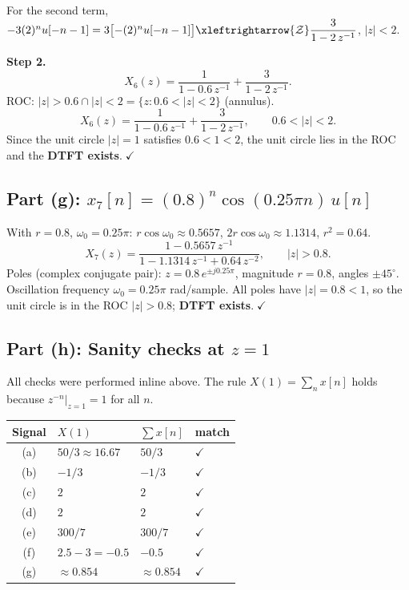\documentclass[11pt]{article}
\newcommand{\zt}{\xleftrightarrow{\mathcal{Z}}}
\begin{document}
For the second term, $-3(2)^{n}u[-n-1]=3\bigl[-(2)^{n}u[-n-1]\bigr]\zt\dfrac{3}{1-2\,z^{-1}}$, $|z|<2$.

\textbf{Step 2.}
\[
X_6(z)=\frac{1}{1-0.6\,z^{-1}}+\frac{3}{1-2\,z^{-1}}.
\]
ROC: $|z|>0.6\cap |z|<2=\{z:0.6<|z|<2\}$ (annulus).
\begin{equation*}
\boxed{X_6(z)=\dfrac{1}{1-0.6\,z^{-1}}+\dfrac{3}{1-2\,z^{-1}}, \qquad 0.6<|z|<2.}
\end{equation*}
Since the unit circle $|z|=1$ satisfies $0.6<1<2$, the unit circle lies in the ROC and the \textbf{DTFT exists}.$\;\checkmark$

\subsection*{Part (g): $x_7[n] = (0.8)^{n}\cos(0.25\pi n)\,u[n]$}
With $r=0.8$, $\omega_0=0.25\pi$: $r\cos\omega_0\approx 0.5657$, $2r\cos\omega_0\approx 1.1314$, $r^{2}=0.64$.
\begin{equation*}
\boxed{X_7(z)=\dfrac{1-0.5657\,z^{-1}}{1-1.1314\,z^{-1}+0.64\,z^{-2}}, \qquad |z|>0.8.}
\end{equation*}
Poles (complex conjugate pair): $z=0.8\,e^{\pm j 0.25\pi}$, magnitude $r=0.8$, angles $\pm 45^{\circ}$. Oscillation frequency $\omega_0=0.25\pi$ rad/sample. All poles have $|z|=0.8<1$, so the unit circle is in the ROC $|z|>0.8$; \textbf{DTFT exists}.$\;\checkmark$

\subsection*{Part (h): Sanity checks at $z=1$}
All checks were performed inline above. The rule $X(1)=\sum_n x[n]$ holds because $z^{-n}|_{z=1}=1$ for all $n$.

\begin{center}
\begin{tabular}{@{}clll@{}}
\toprule
Signal & $X(1)$ & $\sum x[n]$ & match \\
\midrule
(a) & $50/3\approx 16.67$ & $50/3$ & $\checkmark$ \\
(b) & $-1/3$ & $-1/3$ & $\checkmark$ \\
(c) & $2$ & $2$ & $\checkmark$ \\
(d) & $2$ & $2$ & $\checkmark$ \\
(e) & $300/7$ & $300/7$ & $\checkmark$ \\
(f) & $2.5-3=-0.5$ & $-0.5$ & $\checkmark$ \\
(g) & $\approx 0.854$ & $\approx 0.854$ & $\checkmark$ \\
\bottomrule
\end{tabular}
\end{center}
\end{document}
